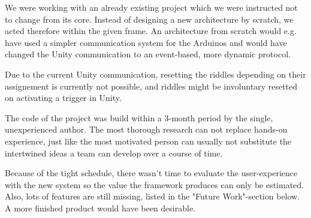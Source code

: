 We were working with an already existing project which we were instructed not to change from its core. 
Instead of designing a new architecture by scratch, we acted therefore within the given frame. 
An architecture from scratch would e.g. have used a simpler communication system for the Arduinos and would have changed 
the Unity communication to an event-based, more dynamic protocol.  

Due to the current Unity communication, resetting the riddles depending on their assignement
is currently not possible, and riddles might be involuntary resetted on activating a trigger in Unity.

The code of the project was build within a 3-month period by the single, unexperienced author.
The most thorough research can not replace hands-on experience, 
just like the most motivated person can usually not substitute the intertwined ideas a team can develop over a course of time.

Because of the tight schedule, there wasn't time to evaluate the user-experience with the new system so the value the framework produces can only be estimated.
Also, lots of features are still missing, listed in the "Future Work"-section below.
A more finished product would have been desirable.


